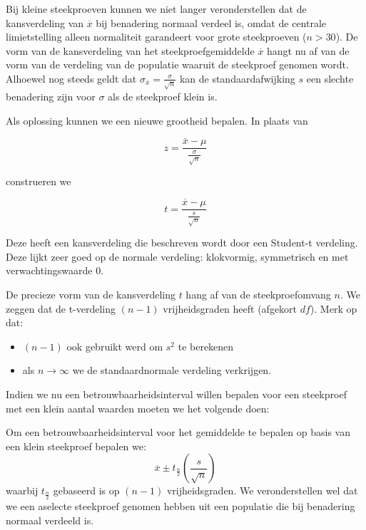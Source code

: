 Bij kleine steekproeven kunnen we niet langer veronderstellen dat de kansverdeling van $\overline{x}$ bij benadering
normaal verdeel is, omdat de centrale limietstelling alleen normaliteit garandeert voor grote steekproeven ($n >30$). De vorm
van de kansverdeling van het steekproefgemiddelde $\overline{x}$ hangt nu af van de vorm van de verdeling van de populatie waaruit de
steekproef genomen wordt. Alhoewel nog steeds geldt dat $\sigma_{\overline{x}} = \frac{\sigma}{\sqrt{n}}$ kan
de standaardafwijking $s$ een slechte benadering zijn voor $\sigma$ als de steekproef klein is.

Als oplossing kunnen we een nieuwe grootheid bepalen. In plaats van

\[ z = \frac{\overline{x} - \mu}{\frac{\sigma}{\sqrt{n}}} \]

construeren we

\[ t = \frac{\overline{x} - \mu}{\frac{s}{\sqrt{n}}} \]

Deze heeft een kansverdeling die beschreven wordt door een Student-t verdeling. Deze lijkt zeer goed op de normale verdeling: klokvormig, symmetrisch en met verwachtingswaarde 0.

De precieze vorm van de kansverdeling $t$ hang af van de steekproefomvang $n$. We zeggen dat de t-verdeling $(n-1)$ vrijheidsgraden heeft (afgekort $df$).
Merk op dat:
\begin{itemize}
  \item $(n-1)$ ook gebruikt werd om $s^{2}$ te berekenen
  \item als $n \rightarrow \infty$ we de standaardnormale verdeling verkrijgen.
\end{itemize}

Indien we nu een betrouwbaarheidsinterval willen bepalen voor een steekproef met een klein aantal waarden moeten we het volgende doen:

\begin{definition}
  Om een betrouwbaarheidsinterval voor het gemiddelde te bepalen op basis van een klein steekproef bepalen we:
  \[ \overline{x} \pm t_{\frac{\alpha}{2}}(\frac{s}{\sqrt{n}}) \]
  waarbij $t_{\frac{\alpha}{2}}$ gebaseerd is op $(n-1)$ vrijheidsgraden. We veronderstellen wel dat we een aselecte steekproef genomen hebben uit
  een populatie die bij benadering normaal verdeeld is.
\end{definition}

